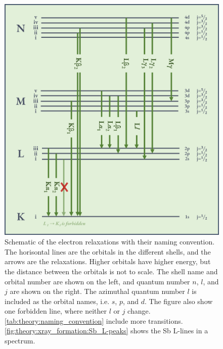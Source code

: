 \begin{figure}[p]
    \centering
    \includegraphics[width=0.95\linewidth]{figures/transition_lines.png}
    \caption{
        Schematic of the electron relaxations with their naming convention.
        The horisontal lines are the orbitals in the different shells, and the arrows are the relaxations.
        Higher orbitals have higher energy, but the distance between the orbitals is not to scale.
        The shell name and orbital number are shown on the left, and quantum number $n$, $l$, and $j$ are shown on the right.
        The azimuthal quantum number $l$ is included as the orbital names, i.e. $s$, $p$, and $d$.
        The figure also show one forbidden line, where neither $l$ or $j$ change.
        \cref{tab:theory:naming_convention} include more transitions.
        \cref{fig:theory:xray_formation:Sb_L-peaks} shows the Sb L-lines in a spectrum.
    }
    \label{fig:theory:xray_formation:lines}
\end{figure}




